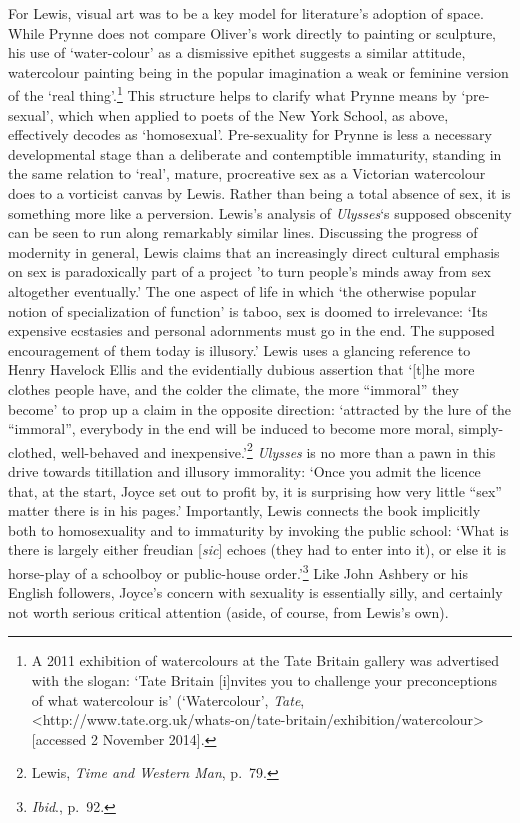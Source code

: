 \documentclass[]{article}
\begin{document}
For Lewis, visual art was to be a key model for literature’s adoption of
space. While Prynne does not compare Oliver’s work directly to painting
or sculpture, his use of ‘water-colour’ as a dismissive epithet suggests
a similar attitude, watercolour painting being in the popular
imagination a weak or feminine version of the ‘real thing’.\footnote{A
  2011 exhibition of watercolours at the Tate Britain gallery was
  advertised with the slogan: ‘Tate Britain {[}i{]}nvites you to
  challenge your preconceptions of what watercolour is’ (‘Watercolour’,
  \emph{Tate},
  \textless{}http://www.tate.org.uk/whats-on/tate-britain/exhibition/watercolour\textgreater{}
  {[}accessed 2 November 2014{]}.} This structure helps to clarify what
Prynne means by ‘pre-sexual’, which when applied to poets of the New
York School, as above, effectively decodes as ‘homosexual’.
Pre-sexuality for Prynne is less a necessary developmental stage than a
deliberate and contemptible immaturity, standing in the same relation to
‘real’, mature, procreative sex as a Victorian watercolour does to a
vorticist canvas by Lewis. Rather than being a total absence of sex, it
is something more like a perversion. Lewis’s analysis of
\emph{Ulysses}‘s supposed obscenity can be seen to run along remarkably
similar lines. Discussing the progress of modernity in general, Lewis
claims that an increasingly direct cultural emphasis on sex is
paradoxically part of a project ’to turn people’s minds away from sex
altogether eventually.’ The one aspect of life in which ‘the otherwise
popular notion of specialization of function’ is taboo, sex is doomed to
irrelevance: ‘Its expensive ecstasies and personal adornments must go in
the end. The supposed encouragement of them today is illusory.’ Lewis
uses a glancing reference to Henry Havelock Ellis and the evidentially
dubious assertion that ‘{[}t{]}he more clothes people have, and the
colder the climate, the more “immoral” they become’ to prop up a claim
in the opposite direction: ‘attracted by the lure of the “immoral”,
everybody in the end will be induced to become more moral,
simply-clothed, well-behaved and inexpensive.’\footnote{Lewis,
  \emph{Time and Western Man}, p.~79.} \emph{Ulysses} is no more than a
pawn in this drive towards titillation and illusory immorality: ‘Once
you admit the licence that, at the start, Joyce set out to profit by, it
is surprising how very little “sex” matter there is in his pages.’
Importantly, Lewis connects the book implicitly both to homosexuality
and to immaturity by invoking the public school: ‘What is there is
largely either freudian {[}\emph{sic}{]} echoes (they had to enter into
it), or else it is horse-play of a schoolboy or public-house
order.’\footnote{\emph{Ibid}., p.~92.} Like John Ashbery or his English
followers, Joyce’s concern with sexuality is essentially silly, and
certainly not worth serious critical attention (aside, of course, from
Lewis’s own).
\end{document}
